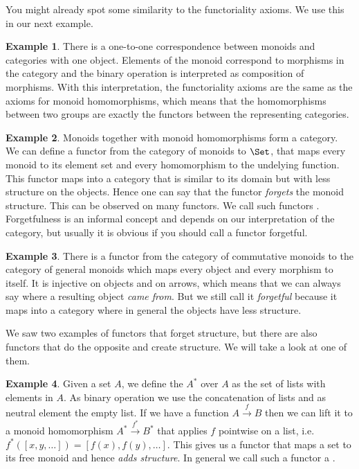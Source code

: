 \documentclass{article}
\theoremstyle{definition}
\newtheorem{example}{Example}
\begin{document}
You might already spot some similarity to the functoriality axioms.
We use this in our next example.

\begin{example}
  There is a one-to-one correspondence between monoids and categories with one object.
  Elements of the monoid correspond to morphisms in the category and the binary operation is interpreted as composition of morphisms.
  With this interpretation, the functoriality axioms are the same as the axioms for monoid homomorphisms, which means that the homomorphisms between two groups are exactly the functors between the representing categories.
\end{example}

\begin{example}
  Monoids together with monoid homomorphisms form a category.
  We can define a functor from the category of monoids to $\Set$, that maps every monoid to its element set and every homomorphism to the undelying function.
  This functor maps into a category that is similar to its domain but with less structure on the objects.
  Hence one can say that the functor \emph{forgets} the monoid structure.
  This can be observed on many functors.
  We call such functors .
  Forgetfulness is an informal concept and depends on our interpretation of the category, but usually it is obvious if you should call a functor forgetful.
\end{example}

\begin{example}
  There is a functor from the category of commutative monoids to the category of general monoids which maps every object and every morphism to itself.
  It is injective on objects and on arrows, which means that we can always say where a resulting object \textit{came from}.
  But we still call it \emph{forgetful} because it maps into a category where in general the objects have less structure.
\end{example}

We saw two examples of functors that forget structure, but there are also functors that do the opposite and create structure.
We will take a look at one of them.

\begin{example}
  Given a set $A$, we define the  $A^*$ over $A$ as the set of lists with elements in $A$.
  As binary operation we use the concatenation of lists and as neutral element the empty list.
  If we have a function $A \xrightarrow{f} B$ then we can lift it to a monoid homomorphism $A^* \xrightarrow{f^*} B^*$ that applies $f$ pointwise on a list, i.e.\ $f^*([x, y, \ldots]) = [f(x), f(y), \ldots]$.
  This gives us a functor that maps a set to its free monoid and hence \emph{adds structure}.
  In general we call such a functor a .
\end{example}
\end{document}
